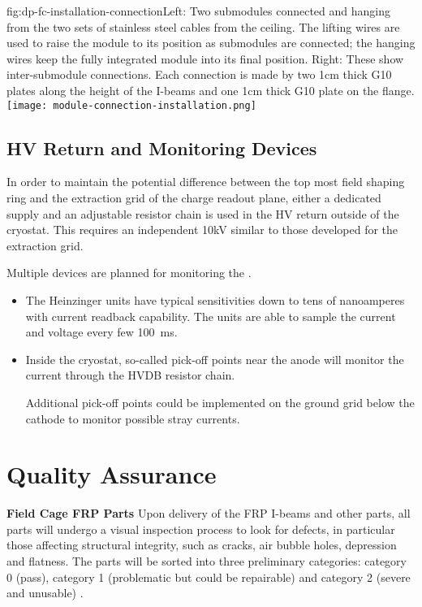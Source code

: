 \begin{dunefigure}{fig:dp-fc-installation-connection}{Left: Two submodules connected and hanging from the two sets of stainless steel cables from the ceiling.  The lifting wires are used to raise the module to its position as submodules are connected; the hanging wires keep the fully integrated module into its final position.  Right: These show inter-submodule connections.  Each connection is made by two 1cm thick G10 plates along the height of the I-beams and one 1cm thick G10 plate on the flange.}
\texttt{[image: module-connection-installation.png]}
\end{dunefigure}


\subsection{HV Return and Monitoring Devices}

In order to maintain the potential difference between the top most field shaping ring and the extraction grid of the charge readout plane, either a dedicated  supply and an adjustable resistor chain is used in the HV return outside of the cryostat.  This requires an independent 10kV \fdth similar to those developed for the extraction grid.

Multiple devices are planned for monitoring the \hv.  
\begin{itemize}
\item The Heinzinger units have typical sensitivities down to tens of nanoamperes with current readback capability.  The units are able to sample the current and voltage every few \SI{100}{\milli\s}.  
\item Inside the cryostat, so-called pick-off points near the anode will monitor the current through the HVDB resistor chain.  

Additional pick-off points could be implemented on the ground grid below the cathode to monitor possible stray currents.
\end{itemize}
\noindent 


\section{Quality Assurance}
\label{sec:fddp-hv-qa}

{\bf Field Cage FRP Parts} Upon delivery of the FRP I-beams and other parts, all parts will undergo a visual inspection process to look for defects, in particular those affecting structural integrity, such as cracks, air bubble holes, depression and flatness. The parts will be sorted into three preliminary categories: category 0 (pass), category 1 (problematic but could be repairable) and category 2 (severe and unusable) .

